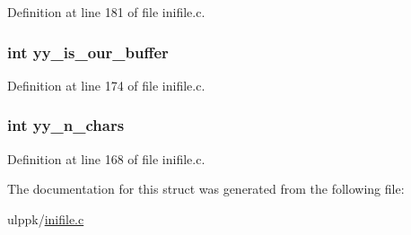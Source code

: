 Definition at line 181 of file inifile.\-c.

\hypertarget{structyy__buffer__state_a1e64bbdc1343d886bee3af97e19644bc}{
\subsubsection[{yy\-\_\-is\-\_\-our\-\_\-buffer}]{\setlength{\rightskip}{0pt plus 5cm}int yy\-\_\-is\-\_\-our\-\_\-buffer}}\label{structyy__buffer__state_a1e64bbdc1343d886bee3af97e19644bc}


Definition at line 174 of file inifile.\-c.

\hypertarget{structyy__buffer__state_aa86c122f2050dbfd365fcf547e6fc1c3}{
\subsubsection[{yy\-\_\-n\-\_\-chars}]{\setlength{\rightskip}{0pt plus 5cm}int yy\-\_\-n\-\_\-chars}}\label{structyy__buffer__state_aa86c122f2050dbfd365fcf547e6fc1c3}


Definition at line 168 of file inifile.\-c.



The documentation for this struct was generated from the following file\-:\begin{DoxyCompactItemize}
\item 
ulppk/\hyperlink{inifile_8c}{inifile.\-c}\end{DoxyCompactItemize}
